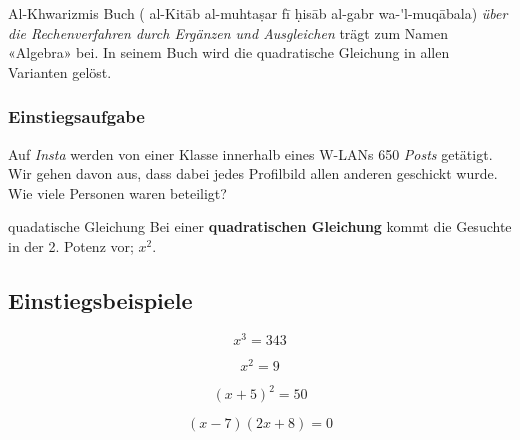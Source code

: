 Al-Khwarizmis Buch (
al-Kit\={a}b al-muhta\d{s}ar f\={i} \d{h}is\={a}b al-gabr wa-\'{}l-muq\={a}bala) \textit{über die Rechenverfahren durch Ergänzen und
Ausgleichen} trägt zum Namen «Algebra» bei. In seinem Buch wird die
quadratische Gleichung in allen Varianten gelöst.

\subsubsection{Einstiegsaufgabe}
Auf \textit{Insta} werden von einer Klasse innerhalb eines W-LANs 650
\textit{Posts} getätigt. Wir gehen davon aus, dass dabei jedes
Profilbild allen anderen geschickt wurde. Wie viele Personen waren
beteiligt?



\begin{definition}{quadatische Gleichung}{}
  Bei einer \textbf{quadratischen Gleichung} kommt die Gesuchte in der
  2. Potenz vor; \zB $x^2$.
\end{definition}

\newpage


\subsection{Einstiegsbeispiele}
$$x^3=343$$


$$x^2=9$$


$$(x+5)^2=50$$


$$(x-7)(2x+8) = 0$$

\newpage


